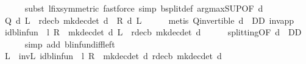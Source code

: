 \begin{isabellebody}
\ \ \ \ \isamarkupfalse%
\ {\isacharparenleft}{\kern0pt}subst\ l{\isacharunderscore}{\kern0pt}fix{\isacharbrackleft}{\kern0pt}symmetric{\isacharbrackright}{\kern0pt}{\isacharparenright}{\kern0pt}\ {\isacharparenleft}{\kern0pt}fastforce\ simp{\isacharcolon}{\kern0pt}\ {\isasymL}\isactrlsub b{\isacharunderscore}{\kern0pt}split{\isacharunderscore}{\kern0pt}def{\isacharprime}{\kern0pt}\ arg{\isacharunderscore}{\kern0pt}max{\isacharunderscore}{\kern0pt}SUP{\isacharbrackleft}{\kern0pt}OF\ d{\isacharbrackright}{\kern0pt}{\isacharparenright}{\kern0pt}\isanewline
\ \ \isamarkupfalse%
\ {\isachardoublequoteopen}Q\ d\ L\ {\isacharequal}{\kern0pt}\ r{\isacharunderscore}{\kern0pt}dec\isactrlsub b\ {\isacharparenleft}{\kern0pt}mk{\isacharunderscore}{\kern0pt}dec{\isacharunderscore}{\kern0pt}det\ d{\isacharparenright}{\kern0pt}\ {\isacharplus}{\kern0pt}\ R\ d\ L{\isachardoublequoteclose}\isanewline
\ \ \ \ \isamarkupfalse%
\ {\isacharparenleft}{\kern0pt}metis\ Q{\isacharunderscore}{\kern0pt}invertible\ {\isacartoucheopen}d\ {\isasymin}\ D\isactrlsub D{\isacartoucheclose}\ inv{\isacharunderscore}{\kern0pt}app{}{\isacharprime}{\kern0pt}{\isacharparenright}{\kern0pt}\isanewline
\ \ \isamarkupfalse%
\ {\isachardoublequoteopen}{\isacharparenleft}{\kern0pt}id{\isacharunderscore}{\kern0pt}blinfun\ {\isacharminus}{\kern0pt}\ l\ {\isacharasterisk}{\kern0pt}\isactrlsub R\ {\isasymP}\ {\isacharparenleft}{\kern0pt}mk{\isacharunderscore}{\kern0pt}dec{\isacharunderscore}{\kern0pt}det\ d{\isacharparenright}{\kern0pt}{\isacharparenright}{\kern0pt}\ L\ {\isacharequal}{\kern0pt}\ r{\isacharunderscore}{\kern0pt}dec\isactrlsub b\ {\isacharparenleft}{\kern0pt}mk{\isacharunderscore}{\kern0pt}dec{\isacharunderscore}{\kern0pt}det\ d{\isacharparenright}{\kern0pt}{\isachardoublequoteclose}\isanewline
\ \ \ \ \isamarkupfalse%
\ splitting{\isacharbrackleft}{\kern0pt}OF\ {\isacartoucheopen}d\ {\isasymin}\ D\isactrlsub D{\isacartoucheclose}{\isacharbrackright}{\kern0pt}\isanewline
\ \ \ \ \isamarkupfalse%
\ {\isacharparenleft}{\kern0pt}simp\ add{\isacharcolon}{\kern0pt}\ blinfun{\isachardot}{\kern0pt}diff{\isacharunderscore}{\kern0pt}left{\isacharparenright}{\kern0pt}\isanewline
\ \ \isamarkupfalse%
\ {\isachardoublequoteopen}L\ {\isacharequal}{\kern0pt}\ inv\isactrlsub L\ {\isacharparenleft}{\kern0pt}{\isacharparenleft}{\kern0pt}id{\isacharunderscore}{\kern0pt}blinfun\ {\isacharminus}{\kern0pt}\ l\ {\isacharasterisk}{\kern0pt}\isactrlsub R\ {\isasymP}\ {\isacharparenleft}{\kern0pt}mk{\isacharunderscore}{\kern0pt}dec{\isacharunderscore}{\kern0pt}det\ d{\isacharparenright}{\kern0pt}{\isacharparenright}{\kern0pt}{\isacharparenright}{\kern0pt}\ {\isacharparenleft}{\kern0pt}r{\isacharunderscore}{\kern0pt}dec\isactrlsub b\ {\isacharparenleft}{\kern0pt}mk{\isacharunderscore}{\kern0pt}dec{\isacharunderscore}{\kern0pt}det\ d{\isacharparenright}{\kern0pt}{\isacharparenright}{\kern0pt}{\isachardoublequoteclose}\isanewline

\end{isabellebody}
